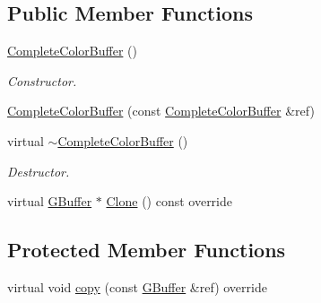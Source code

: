 \subsection*{Public Member Functions}
\begin{DoxyCompactItemize}
\item 
\mbox{\label{class_geometry_engine_1_1_geometry_buffer_1_1_complete_color_buffer_a82f095f182124cf3044333cdb738a4c1}} 
\mbox{\hyperlink{class_geometry_engine_1_1_geometry_buffer_1_1_complete_color_buffer_a82f095f182124cf3044333cdb738a4c1}{Complete\+Color\+Buffer}} ()
\begin{DoxyCompactList}\small\item\em Constructor. \end{DoxyCompactList}\item 
\mbox{\hyperlink{class_geometry_engine_1_1_geometry_buffer_1_1_complete_color_buffer_ad1b8c2aed3b0c6154836275c91964a5a}{Complete\+Color\+Buffer}} (const \mbox{\hyperlink{class_geometry_engine_1_1_geometry_buffer_1_1_complete_color_buffer}{Complete\+Color\+Buffer}} \&ref)
\item 
\mbox{\label{class_geometry_engine_1_1_geometry_buffer_1_1_complete_color_buffer_a1bcffff866586ba2f7088257917f617c}} 
virtual \mbox{\hyperlink{class_geometry_engine_1_1_geometry_buffer_1_1_complete_color_buffer_a1bcffff866586ba2f7088257917f617c}{$\sim$\+Complete\+Color\+Buffer}} ()
\begin{DoxyCompactList}\small\item\em Destructor. \end{DoxyCompactList}\item 
virtual \mbox{\hyperlink{class_geometry_engine_1_1_geometry_buffer_1_1_g_buffer}{G\+Buffer}} $\ast$ \mbox{\hyperlink{class_geometry_engine_1_1_geometry_buffer_1_1_complete_color_buffer_a56aee74c7523f0b16fd8b97c8c44f84f}{Clone}} () const override
\end{DoxyCompactItemize}
\subsection*{Protected Member Functions}
\begin{DoxyCompactItemize}
\item 
virtual void \mbox{\hyperlink{class_geometry_engine_1_1_geometry_buffer_1_1_complete_color_buffer_a0630be352a9267083d42802fb22ae36b}{copy}} (const \mbox{\hyperlink{class_geometry_engine_1_1_geometry_buffer_1_1_g_buffer}{G\+Buffer}} \&ref) override
\end{DoxyCompactItemize}
